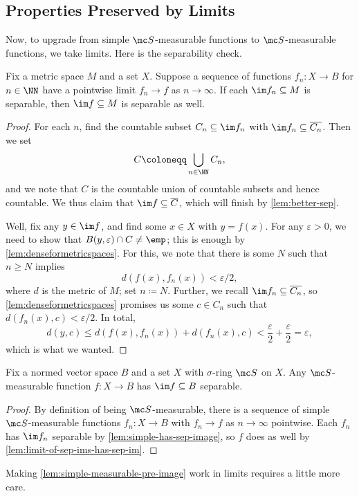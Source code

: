 \documentclass[../notes.tex]{subfiles}
\begin{document}
\subsection{Properties Preserved by Limits}
Now, to upgrade from simple $\mc S$-measurable functions to $\mc S$-measurable functions, we take limits. Here is the separability check.
\begin{lemma} \label{lem:limit-of-sep-ims-has-sep-im}
	Fix a metric space $M$ and a set $X$. Suppose a sequence of functions $f_n\colon X\to B$ for $n\in\NN$ have a pointwise limit $f_n\to f$ as $n\to\infty$. If each $\im f_n\subseteq M$ is separable, then $\im f\subseteq M$ is separable as well.
\end{lemma}
\begin{proof}
	For each $n$, find the countable subset $C_n\subseteq\im f_n$ with $\im f_n\subseteq\overline{C_n}$. Then we set
	\[C\coloneqq\bigcup_{n\in\NN}C_n,\]
	and we note that $C$ is the countable union of countable subsets and hence countable. We thus claim that $\im f\subseteq\overline C$, which will finish by \autoref{lem:better-sep}.

	Well, fix any $y\in\im f$, and find some $x\in X$ with $y=f(x)$. For any $\varepsilon>0$, we need to show that $B(y,\varepsilon)\cap C\ne\emp$; this is enough by \autoref{lem:denseformetricspaces}. For this, we note that there is some $N$ such that $n\ge N$ implies
	\[d(f(x),f_n(x))<\varepsilon/2,\]
	where $d$ is the metric of $M$; set $n\coloneqq N$. Further, we recall $\im f_n\subseteq\overline{C_n}$, so \autoref{lem:denseformetricspaces} promises us some $c\in C_n$ such that $d(f_n(x),c)<\varepsilon/2$. In total,
	\[d(y,c)\le d(f(x),f_n(x))+d(f_n(x),c)<\frac\varepsilon2+\frac\varepsilon2=\varepsilon,\]
	which is what we wanted.
\end{proof}
\begin{corollary} \label{cor:meas-has-sep-limit}
	Fix a normed vector space $B$ and a set $X$ with $\sigma$-ring $\mc S$ on $X$. Any $\mc S$-measurable function $f\colon X\to B$ has $\im f\subseteq B$ separable.
\end{corollary}
\begin{proof}
	By definition of being $\mc S$-measurable, there is a sequence of simple $\mc S$-measurable functions $f_n\colon X\to B$ with $f_n\to f$ as $n\to\infty$ pointwise. Each $f_n$ has $\im f_n$ separable by \autoref{lem:simple-has-sep-image}, so $f$ does as well by \autoref{lem:limit-of-sep-ims-has-sep-im}.
\end{proof}
Making \autoref{lem:simple-measurable-pre-image} work in limits requires a little more care.
\end{document}

